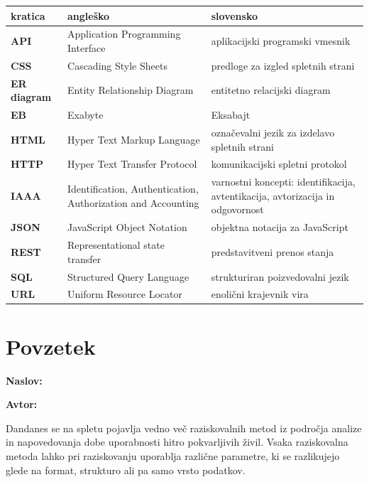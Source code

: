 \noindent \begin{tabular}{p{}|p{}|p{}}    %
{\bf kratica} & {\bf angleško}                             & {\bf slovensko} \\ \hline
{\bf API} & Application Programming Interface & aplikacijski programski vmesnik \\
{\bf CSS} & Cascading Style Sheets & predloge za izgled spletnih strani \\
{\bf ER diagram} & Entity Relationship Diagram & entitetno relacijski diagram \\
{\bf EB} & Exabyte & Eksabajt \\
{\bf HTML} & Hyper Text Markup Language & označevalni jezik za izdelavo spletnih strani \\
{\bf HTTP} & Hyper Text Transfer Protocol & komunikacijski spletni protokol \\
{\bf IAAA} & Identification, Authentication, Authorization and Accounting & varnostni koncepti: identifikacija, avtentikacija, avtorizacija in odgovornost \\
{\bf JSON} & JavaScript Object Notation & objektna notacija za JavaScript \\
{\bf REST} & Representational state transfer & predstavitveni prenos stanja \\
{\bf SQL} & Structured Query Language & strukturiran poizvedovalni jezik \\
{\bf URL} & Uniform Resource Locator & enolični krajevnik vira \\
\end{tabular}


\clearemptydoublepage

\chapter*{Povzetek}

\noindent\textbf{Naslov:} \ttitle
\bigskip

\noindent\textbf{Avtor:} \tauthor
\bigskip

\noindent Dandanes se na spletu pojavlja vedno več raziskovalnih metod iz področja analize in napovedovanja dobe uporabnosti hitro pokvarljivih živil. Vsaka raziskovalna metoda lahko pri raziskovanju uporablja različne parametre, ki se razlikujejo glede na format, strukturo ali pa samo vrsto podatkov.

